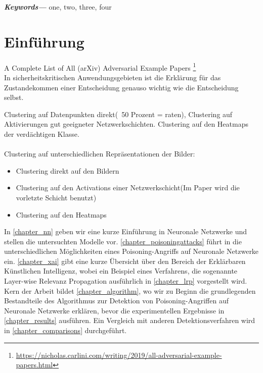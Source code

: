 \documentclass[twoside, 12pt,a4paper]{article}
\providecommand{\keywords}[1]
{
	\small	
	\textbf{\textit{Keywords---}} #1
}
\numberwithin{equation}{section}
\begin{document}
	\keywords{one, two, three, four}
	\newpage
	\listoffigures
	
	\listoftables
	
	\lstlistoflistings
	
	\newpage
	\tableofcontents
	\newpage
	

	
	
	
	\section{Einführung}
	
	A Complete List of All (arXiv) Adversarial Example Papers \footnote{\url{https://nicholas.carlini.com/writing/2019/all-adversarial-example-papers.html}}
	\\
	In sicherheitskritischen Anwendungsgebieten ist die Erklärung für das Zustandekommen einer Entscheidung genauso wichtig wie die Entscheidung selbst\cite{LRP_DNN}.
	
	Clustering auf Datenpunkten direkt(~50 Prozent = raten), Clustering auf Aktivierungen gut geeigneter Netzwerkschichten. Clustering auf den Heatmaps der verdächtigen Klasse.\\
	\\
	
	Clustering auf unterschiedlichen Repräsentationen der Bilder:
	\begin{itemize}
		\item Clustering direkt auf den Bildern\\
		\item Clustering auf den Activations einer Netzwerkschicht(Im Paper \cite{AC} wird die vorletzte Schicht benutzt)
		\item Clustering auf den Heatmaps
	\end{itemize}
	In \autoref{chapter_nn} geben wir eine kurze Einführung in Neuronale Netzwerke und stellen die untersuchten Modelle vor. \autoref{chapter_poisoningattacks} führt in die unterschiedlichen Möglichkeiten eines Poisoning-Angriffs auf Neuronale Netzwerke ein. \autoref{chapter_xai} gibt eine kurze Übersicht über den Bereich der Erklärbaren Künstlichen Intelligenz, wobei ein Beispiel eines Verfahrens, die sogenannte Layer-wise Relevanz Propagation ausführlich in \autoref{chapter_lrp} vorgestellt wird. Kern der Arbeit bildet \autoref{chapter_algorithm}, wo wir zu Beginn die grundlegenden Bestandteile des Algorithmus zur Detektion von Poisoning-Angriffen auf Neuronale Netzwerke erklären, bevor die experimentellen Ergebnisse in \autoref{chapter_results} ausführen. Ein Vergleich mit anderen Detektionsverfahren wird in \autoref{chapter_comparisons} durchgeführt.
\end{document}
